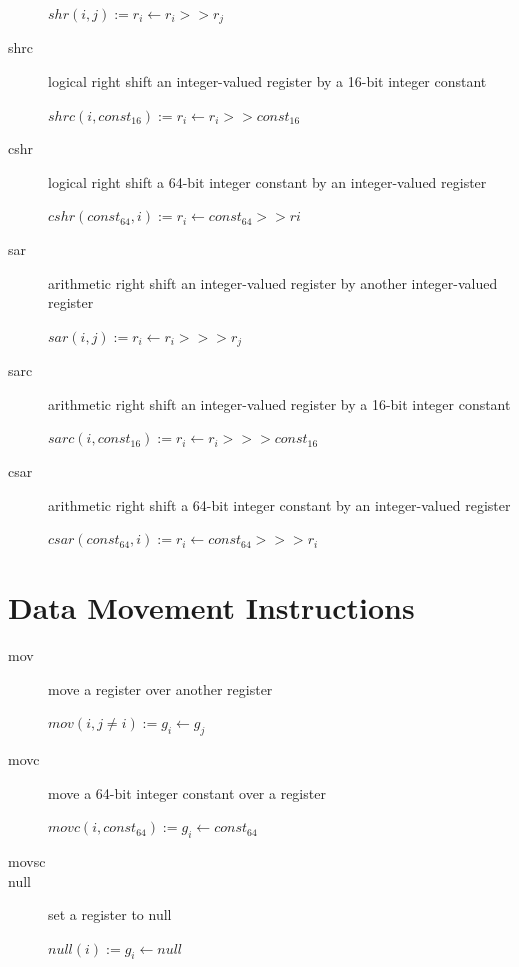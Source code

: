 \documentclass[english,a4paper,12pt]{report}
\begin{document}
\begin{description}
	$shr(i, j) := r _{i} \longleftarrow  r _{i} >> r _{j} $ \\
	\item[shrc] logical right shift an integer-valued register by a 
	16-bit integer constant
	
	$shrc(i, const _{16}) :=  r _{i} \longleftarrow  r _{i} >> const 
	_{16} $ \\
	\item[cshr] logical right shift a 64-bit integer constant by an
	integer-valued register
	
	$cshr(const _{64}, i):=  r _{i} \longleftarrow  const _{64} >> 
	r{i}  $  \\
	\item[sar] arithmetic right shift an integer-valued register by
	another integer-valued register
	
	$sar(i, j) :=  r _{i} \longleftarrow  r _{i} >>> r _{j} $  \\
	\item[sarc] arithmetic right shift an integer-valued register by a
	16-bit integer constant
	
	$sarc(i, const _{16}) :=  r _{i} \longleftarrow  r _{i} >>> const 
	_{16} $ \\
	\item[csar] arithmetic right shift a 64-bit integer constant by an
	integer-valued register
	
	$csar(const _{64}, i):=  r _{i} \longleftarrow  const _{64} >>> r 
	_{i}  $ \\
\end{description}

\section{Data Movement Instructions}
\begin{description}
	\item[mov] move a register over another register
	
	$mov(i, j \neq i) := g_{i} \longleftarrow g_{j} $ \\
	\item[movc] move a 64-bit integer constant over a register
	
	$movc(i, const_{64}):= g_{i} \longleftarrow const_{64} $ \\
	
	\item[movsc]
	
	\item[null] set a register to null
	
	$null(i):= g_{i} \longleftarrow null $ \\
\end{description}
\end{document}
